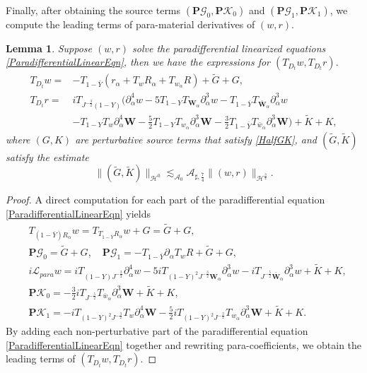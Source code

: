 \documentclass[10pt]{amsart}
\newtheorem{lemma}[theorem]{Lemma}
\theoremstyle{remark}
\theoremstyle{definition}
\numberwithin{equation}{section}
\newcommand{\p}{\partial}
\newcommand{\al}{\alpha}
\newcommand{\f}{\frac}
\newcommand{\bw}{\mathbf{W}}
\newcommand{\nP}{{\mathbf P}}
\newcommand{\CalAZ}{{\mathcal{A}_0}}
\begin{document}
Finally, after obtaining the source terms $(\nP\mathcal{G}_0, \nP\mathcal{K}_0)$ and $(\nP\mathcal{G}_1, \nP\mathcal{K}_1)$, we compute the leading terms of para-material derivatives of $(w,r)$.
\begin{lemma}
Suppose  $(w,r)$ solve the paradifferential linearized equations \eqref{ParadifferentialLinearEqn}, then we have the expressions for $(T_{D_t}w, T_{D_t}r)$. 
\begin{equation} \label{wrParaMaterial}
\begin{aligned}
T_{D_t}w  =& -T_{1-\bar{Y}}(r_\alpha + T_w R_\alpha + T_{w_\al}R)+ \tilde{G} +G,\\
T_{D_t}r  =& iT_{J^{-\frac{3}{2}}(1-Y)}\big(\p_\al^4w -5T_{1-Y}T_{\mathbf{W}_{\al}}\p_{\al}^3w-T_{1-\bar{Y}}T_{\bar{\bw}_\al}\p_{\al}^3w \\
&-T_{1-Y}T_w \p_\al^4\bw -\f52 T_{1-Y}T_{w_\al} \p_\al^3\bw -\f32 T_{1-\bar{Y}}T_{\bar{w}_\al}\p_\al^3 \bw\big)+\tilde{K}+K, 
\end{aligned}
\end{equation}
where $(G,K)$ are perturbative source terms that satisfy \eqref{HalfGK}, and $(\tilde{G}, \tilde{K})$ satisfy the estimate
\begin{equation*}
    \| (\tilde{G}, \tilde{K})\|_{\mathcal{H}^0} \lesssim_{\CalAZ} \mathcal{A}_{\sharp, \f74}  \| (w,r)\|_{\mathcal{H}^{\f34}}.
\end{equation*}
\end{lemma}

\begin{proof}
A direct computation for each part of the paradifferential equation \eqref{ParadifferentialLinearEqn} yields
\begin{align*}
 &T_{(1-\bar{Y})R_{\al}}w = T_{T_{1-\bar{Y}}R_\al}w + G = \tilde{G} + G, \\
 &\nP \mathcal{G}_0 = \tilde{G} + G, \quad \nP \mathcal{G}_1 = -T_{1-\bar{Y}}\p_\al T_w R + \tilde{G} + G, \\
 & i\mathcal{L}_{para}w = iT_{(1-Y)J^{-\f32}}\p_{\al}^4w-5iT_{(1-Y)^2J^{-\f32}\mathbf{W}_{\al}}\p_{\al}^3w-iT_{J^{-\f52}\bar{\bw}_{\al}}\p_{\al}^3w  + \tilde{K} + K,\\
 &\nP \mathcal{K}_0 = - \f32iT_{J^{-\f52}}T_{\bar{w}_{\al}} \p^3_{\al}\bw+\tilde{K} + K, \\
 & \nP \mathcal{K}_1 = -iT_{(1-Y)^2J^{-\f32}}T_{w}\p^4_{\al}\mathbf{W} -\f52iT_{(1-Y)^2J^{-\f32}}T_{w_{\al}}\p^3_{\al}\mathbf{W}+\tilde{K} + K.
\end{align*}
By adding each non-perturbative part of the paradifferential equation \eqref{ParadifferentialLinearEqn} together and rewriting para-coefficients, we obtain the leading terms of $(T_{D_t}w, T_{D_t}r)$.
\end{proof}
\end{document}
